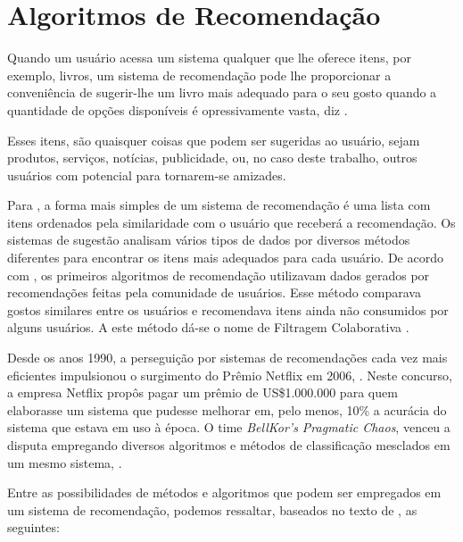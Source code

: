 
\section{Algoritmos de Recomendação}

% 


Quando um usuário acessa um sistema qualquer que lhe oferece itens, por exemplo, livros, um sistema de recomendação pode lhe proporcionar a conveniência de sugerir-lhe um livro mais adequado para o seu gosto quando a quantidade de opções disponíveis é opressivamente vasta, diz \cite{Ricci2010}.

Esses itens, são quaisquer coisas que podem ser sugeridas ao usuário, sejam produtos, serviços, notícias, publicidade, ou, no caso deste trabalho, outros usuários com potencial para tornarem-se amizades.

Para \cite{Ricci2010}, a forma mais simples de um sistema de recomendação é uma lista com itens ordenados pela similaridade com o usuário que receberá a recomendação. Os sistemas de sugestão analisam vários tipos de dados por diversos métodos diferentes para encontrar os itens mais adequados para cada usuário. De acordo com \cite{Ricci2010}, os primeiros algoritmos de recomendação utilizavam dados gerados por recomendações feitas pela comunidade de usuários. Esse método comparava gostos similares entre os usuários e recomendava itens ainda não consumidos por alguns usuários. A este método dá-se o nome de Filtragem Colaborativa \citep{goldberg92}.

Desde os anos 1990, a perseguição por sistemas de recomendações cada vez mais eficientes impulsionou o surgimento do Prêmio Netflix em 2006, \citep{netflix}. Neste concurso, a empresa Netflix propôs pagar um prêmio de US\$1.000.000 para quem elaborasse um sistema que pudesse melhorar em, pelo menos, 10\% a acurácia do sistema que estava em uso à época. O time \emph{BellKor's Pragmatic Chaos}, venceu a disputa empregando diversos algoritmos e métodos de classificação mesclados em um mesmo sistema, \citep{Bell}. 

Entre as possibilidades de métodos e algoritmos que podem ser empregados em um sistema de recomendação, podemos ressaltar, baseados no texto de \cite{Recommendation}, as seguintes:

